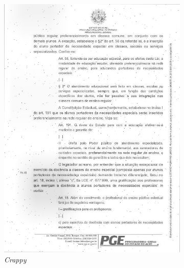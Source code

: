 \begin{figure}[H]
\begin{subfigure}[t]{.3\linewidth}
    \includegraphics[width=\textwidth]{figuras/1004871_310554941_13_crappy.jpg}
    \caption{\textit{Crappy}}
  \end{subfigure}
  \begin{subfigure}[t]{0.3\linewidth}

\end{subfigure}
\end{figure}
